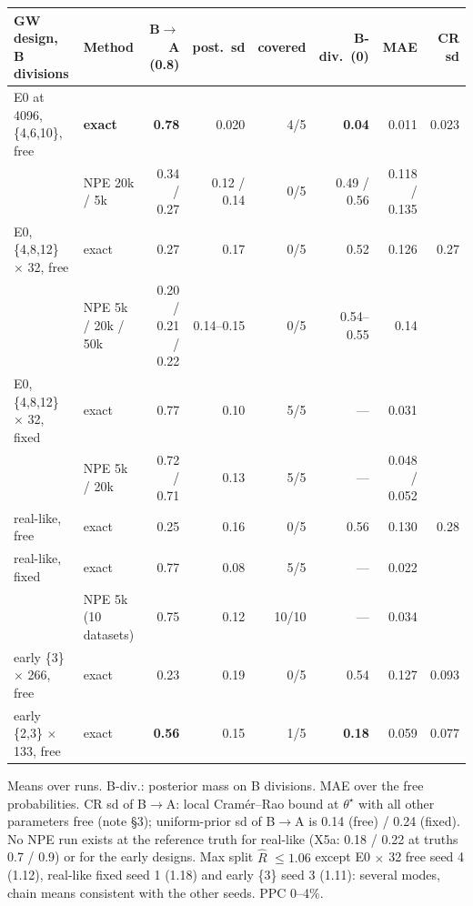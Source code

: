 \documentclass[10pt,a4paper]{article}
\newcommand{\code}[1]{\texttt{\detokenize{#1}}}
\newcommand{\blk}[1]{\par\needspace{5\baselineskip}\smallskip{\sffamily\bfseries\color{inkgray}#1}\par}
\newcommand{\Comment}{\blk{Comment}}
\renewcommand{\blk}[1]{\par\Needspace*{5\baselineskip}\smallskip{\sffamily\bfseries\color{inkgray}#1}\par}
\begin{document}
\begin{center}\footnotesize\setlength{\tabcolsep}{3pt}
\begin{tabular}{@{}llrrrrrr@{}}\toprule
GW design, B divisions & Method & B$\to$A (0.8) & post.\ sd & covered & B-div.\ (0) & MAE & CR sd \\\midrule
E0 at 4096, \{4,6,10\}, free & \textbf{exact} & \textbf{0.78} & 0.020 & 4/5 & \textbf{0.04} & 0.011 & 0.023 \\
 & NPE 20k / 5k & 0.34 / 0.27 & 0.12 / 0.14 & 0/5 & 0.49 / 0.56 & 0.118 / 0.135 & \\
E0, \{4,8,12\} $\times$ 32, free & exact & 0.27 & 0.17 & 0/5 & 0.52 & 0.126 & 0.27 \\
 & NPE 5k / 20k / 50k & 0.20 / 0.21 / 0.22 & 0.14--0.15 & 0/5 & 0.54--0.55 & 0.14 & \\
E0, \{4,8,12\} $\times$ 32, fixed & exact & 0.77 & 0.10 & 5/5 & --- & 0.031 & \\
 & NPE 5k / 20k & 0.72 / 0.71 & 0.13 & 5/5 & --- & 0.048 / 0.052 & \\
real-like, free & exact & 0.25 & 0.16 & 0/5 & 0.56 & 0.130 & 0.28 \\
real-like, fixed & exact & 0.77 & 0.08 & 5/5 & --- & 0.022 & \\
 & NPE 5k (10 datasets) & 0.75 & 0.12 & 10/10 & --- & 0.034 & \\
early \{3\} $\times$ 266, free & exact & 0.23 & 0.19 & 0/5 & 0.54 & 0.127 & 0.093 \\
early \{2,3\} $\times$ 133, free & exact & \textbf{0.56} & 0.15 & 1/5 & \textbf{0.18} & 0.059 & 0.077 \\\bottomrule
\end{tabular}

Means over runs. B-div.: posterior mass on B divisions. MAE over the free probabilities. CR sd of B$\to$A: local Cram\'er--Rao bound at $\theta^\star$ with all other parameters free (note \S3); uniform-prior sd of B$\to$A is 0.14 (free) / 0.24 (fixed). No NPE run exists at the reference truth for real-like \code{two_type} (X5a: 0.18 / 0.22 at truths 0.7 / 0.9) or for the early designs. Max split $\hat R$ $\le 1.06$ except E0 $\times$ 32 free seed 4 (1.12), real-like fixed seed 1 (1.18) and early \{3\} seed 3 (1.11): several modes, chain means consistent with the other seeds. PPC 0--4\%.
\end{center}
\Comment
\end{document}
